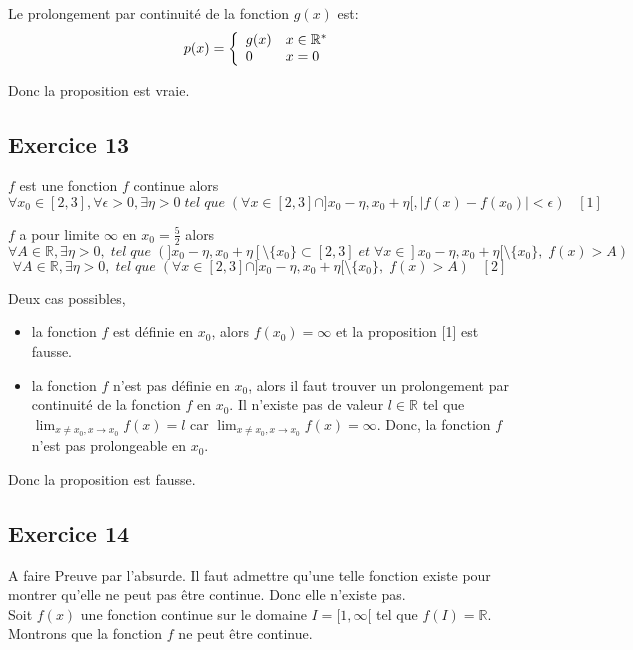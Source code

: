 \documentclass[]{book}
\theoremstyle{definition}
\newcommand{\bb}[1]{\mathbb{#1}}
\newcommand{\R}{\bb{R}}
\begin{document}
Le prolongement par continuit\'e de la fonction $g(x)$ est: 
$$p(x) = 
\left\{ 
\begin{array}{l l}
 g(x) & x \in \R^{*}\\
 0 & x = 0\\
\end{array}
\right. 
$$

Donc la proposition est vraie.


\subsection*{Exercice 13}
$f$ est une fonction $f$ continue alors 
$$\forall x_0 \in [2,3], \forall \epsilon >0, \exists \eta > 0\; tel\; que\; (\forall x \in [2,3] \cap ]x_0-\eta, x_0+\eta[, |f(x)-f(x_0)| < \epsilon) \;\;\; [1]$$ 

$f$ a pour limite $\infty$ en $x_0=\frac{5}{2}$ alors
$$\forall A \in \R, \exists \eta > 0,\; tel\; que\; (]x_0-\eta, x_0+\eta[ \setminus \{x_0\} \subset [2,3] \; et \; \forall x \in ]x_0-\eta, x_0+\eta[ \setminus \{x_0\},\; f(x) > A)$$
$$\forall A \in \R, \exists \eta > 0,\; tel\; que\; (\forall x \in [2,3] \cap ]x_0-\eta, x_0+\eta[ \setminus \{x_0\}, \; f(x) > A) \;\;\; [2]$$

Deux cas possibles, 
\begin{itemize}
\item la fonction $f$ est d\'efinie en $x_0$, alors $f(x_0) = \infty$ et la proposition [1] est fausse.
\item la fonction $f$ n'est pas d\'efinie en $x_0$, alors il faut trouver un prolongement par continuit\'e de la fonction $f$ en $x_0$. Il n'existe pas de valeur $l \in \R$ tel que $\lim_{x \neq x_0, x \to x_0} f(x) = l$ car $\lim_{x \neq x_0, x \to x_0} f(x) = \infty$. Donc,  la fonction $f$ n'est pas prolongeable en $x_0$.
\end{itemize}


Donc la proposition est fausse.


\subsection*{Exercice 14}
A faire
Preuve par l'absurde. Il faut admettre qu'une telle fonction existe pour montrer qu'elle ne peut pas \^etre continue. Donc elle n'existe pas.\\

Soit $f(x)$ une fonction continue sur le domaine $I = [1,\infty[$ tel que $f(I) = \R$. Montrons que la fonction $f$ ne peut \^etre continue.\\
\end{document}
